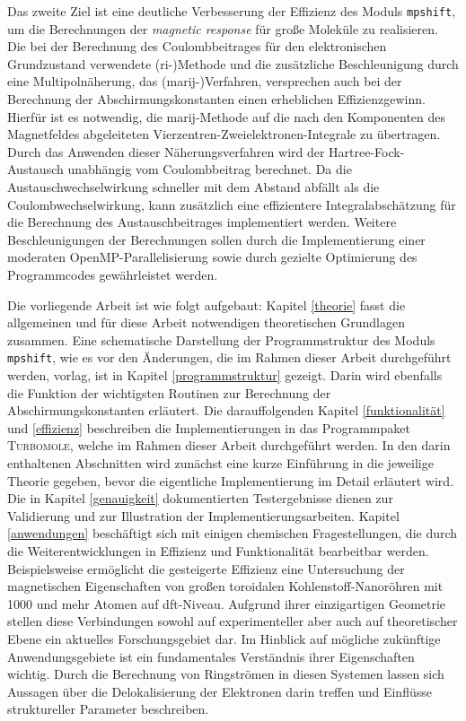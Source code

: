 Das zweite Ziel ist eine deutliche Verbesserung der Effizienz des Moduls \texttt{mpshift}, um die Berechnungen der \textit{magnetic response} für große Moleküle zu realisieren. Die bei der Berechnung des Coulombbeitrages für den elektronischen Grundzustand verwendete \mbox{(\acs{ri}-)}Methode\supercite{vahtras1993integral} und die zusätzliche Beschleunigung durch eine Multipolnäherung, das \mbox{(\acs{marij}-)}Verfahren\supercite{sierka2003fast}, versprechen auch bei der Berechnung der Abschirmungskonstanten einen erheblichen Effizienzgewinn. Hierfür ist es notwendig, die \ac{marij}-Methode auf die nach den Komponenten des Magnetfeldes abgeleiteten Vierzentren-Zweielektronen-Integrale zu übertragen. Durch das Anwenden dieser Näherungsverfahren wird der Hartree-Fock-Austausch unabhängig vom Coulombbeitrag berechnet. Da die Austauschwechselwirkung schneller mit dem Abstand abfällt als die Coulombwechselwirkung, kann zusätzlich eine effizientere Integralabschätzung für die Berechnung des Austauschbeitrages implementiert werden. Weitere Beschleunigungen der Berechnungen sollen durch die Implementierung einer moderaten OpenMP-Parallelisierung sowie durch gezielte Optimierung des Programmcodes gewährleistet werden. 

\bigskip
Die vorliegende Arbeit ist wie folgt aufgebaut: Kapitel \ref{theorie} fasst die allgemeinen und für diese Arbeit notwendigen theoretischen Grundlagen zusammen. Eine schematische Darstellung der Programmstruktur des Moduls \texttt{mpshift}, wie es vor den Änderungen, die im Rahmen dieser Arbeit durchgeführt werden, vorlag, ist in Kapitel \ref{programmstruktur} gezeigt. Darin wird ebenfalls die Funktion der wichtigsten Routinen zur Berechnung der Abschirmungskonstanten erläutert. Die darauffolgenden Kapitel \ref{funktionalität} und \ref{effizienz} beschreiben die Implementierungen in das Programmpaket \textsc{Turbomole}, welche im Rahmen dieser Arbeit durchgeführt werden. In den darin enthaltenen Abschnitten wird zunächst eine kurze Einführung in die jeweilige Theorie gegeben, bevor die eigentliche Implementierung im Detail erläutert wird. Die in Kapitel \ref{genauigkeit} dokumentierten Testergebnisse dienen zur Validierung und zur Illustration der Implementierungsarbeiten. Kapitel \ref{anwendungen} beschäftigt sich mit einigen chemischen Fragestellungen, die durch die Weiterentwicklungen in Effizienz und Funktionalität bearbeitbar werden. Beispielsweise ermöglicht die gesteigerte Effizienz eine Untersuchung der magnetischen Eigenschaften von großen toroidalen Kohlenstoff-Nanoröhren mit 1000 und mehr Atomen auf \ac{dft}-Niveau. Aufgrund ihrer einzigartigen Geometrie stellen diese Verbindungen sowohl auf experimenteller aber auch auf theoretischer Ebene ein aktuelles Forschungsgebiet dar. Im Hinblick auf mögliche zukünftige Anwendungsgebiete ist ein fundamentales Verständnis ihrer Eigenschaften wichtig. Durch die Berechnung von Ringströmen in diesen Systemen lassen sich Aussagen über die Delokalisierung der Elektronen darin treffen und Einflüsse struktureller Parameter beschreiben. 


